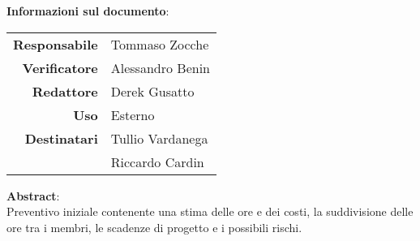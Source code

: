 \begin{center}
\textbf{Informazioni sul documento}: \\
\vspace{0.5cm}

\begin{tabular}{r|l}
    \textbf{Responsabile} &  Tommaso Zocche\\ 
    \textbf{Verificatore} &  Alessandro Benin\\ 
    \textbf{Redattore} &     Derek Gusatto\\ 
    \textbf{Uso} & Esterno \\ 
    \textbf{Destinatari} & Tullio Vardanega \\ & Riccardo Cardin \\ 
\end{tabular}

\vfill

\textbf{Abstract}: \\
\vspace{0.5cm}
Preventivo iniziale contenente una stima delle ore e dei costi, la suddivisione delle ore tra i membri, le scadenze di progetto e i possibili rischi.
\end{center}


\bigskip